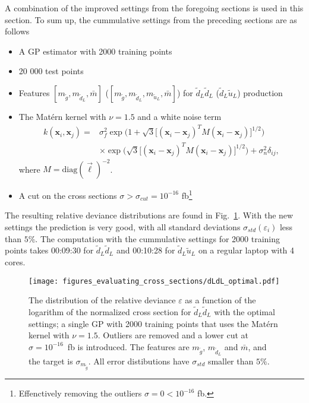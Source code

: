 \documentclass[twoside,english]{uiofysmaster}
\begin{document}
A combination of the improved settings from the foregoing sections is used in this section. To sum up, the cummulative settings from the preceding sections are as follows
\begin{itemize}
\item A GP estimator with 2000 training points
\item 20 000 test points
\item Features $[m_{\tilde{g}}, m_{\tilde{d}_L}, \bar{m}]$ ($[m_{\tilde{g}}, m_{\tilde{d}_L}, m_{\tilde{u}_L}, \bar{m}]$) for $\tilde{d}_L \tilde{d}_L$ ($\tilde{d}_L \tilde{u}_L$) production
\item The Mat\'{e}rn kernel with $\nu=1.5$ and a white noise term
\begin{align}
k (\textbf{x}_i, \textbf{x}_j) =& \sigma_f^2 \exp \Big( 1 + \sqrt{3} \big[ (\textbf{x}_i - \textbf{x}_j)^T M (\textbf{x}_i - \textbf{x}_j) \big]^{1/2} \Big)\\ & \times  \exp \Big( \sqrt{3} \big[ (\textbf{x}_i - \textbf{x}_j)^T M (\textbf{x}_i - \textbf{x}_j) \big]^{1/2} \Big) + \sigma_n^2 \delta_{ij},
\end{align}
where $M = \text{diag}(\vec{\ell})^{-2}$.
\item A cut on the cross sections $\sigma > \sigma_{cut} = 10^{-16}$ fb\footnote{Effenctively removing the outliers $\sigma = 0 < 10^{-16}$ fb.}
\end{itemize}
The resulting relative deviance distributions are found in Fig.~\ref{Fig:: evaluating cross : error distribution dLdL optimal}. With the new settings the prediction is very good, with all standard deviations $\sigma_{std}(\varepsilon_i)$ less than $5\%$. The computation with the cummulative settings for 2000 training points takes 00:09:30 for $\tilde{d}_L \tilde{d}_L$ and 00:10:28 for $\tilde{d}_L \tilde{u}_L$ on a regular laptop with 4 cores. 

\begin{figure}
\centering
\texttt{[image: figures\_evaluating\_cross\_sections/dLdL\_optimal.pdf]}
\caption{The distribution of the relative deviance $\varepsilon$ as a function of the logarithm of the normalized cross section for $\tilde{d}_L \tilde{d}_L$ with the optimal settings; a single GP with 2000 training points that uses the Mat\'{e}rn kernel with $\nu=1.5$. Outliers are removed and a lower cut at $\sigma=10^{-16}$~fb is introduced. The features are $m_{\tilde{g}}$, $m_{\tilde{d}_L}$ and $\bar{m}$, and the target is $\sigma_{m_{\tilde{g}}}$. All error distibutions have $\sigma_{std}$ smaller than $5\%$.}
\label{Fig:: evaluating cross : error distribution dLdL optimal}
\end{figure}
\end{document}
